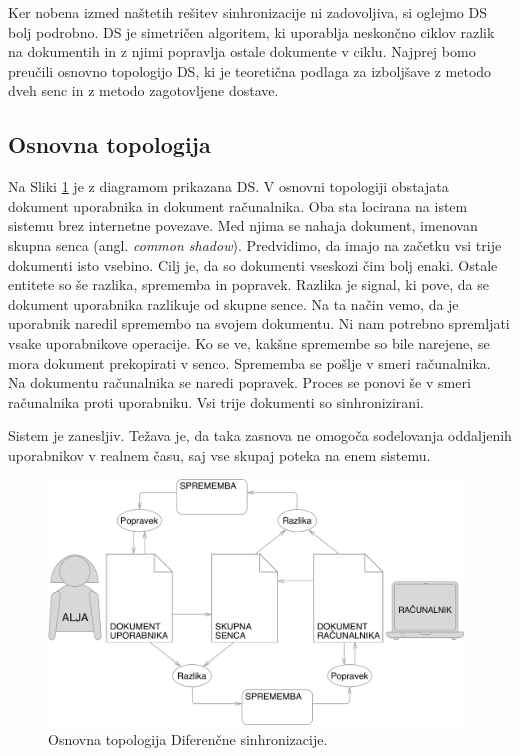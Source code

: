 \documentclass[a4paper, 12pt, twoside]{book}
\begin{document}
Ker nobena izmed naštetih rešitev sinhronizacije ni zadovoljiva, si oglejmo DS bolj podrobno. DS je simetričen algoritem, ki uporablja neskončno ciklov razlik na dokumentih in z njimi popravlja ostale dokumente v ciklu. Najprej bomo preučili osnovno topologijo DS, ki je teoretična podlaga za izboljšave z metodo dveh senc in z metodo zagotovljene dostave.

\subsection{Osnovna topologija}

Na Sliki \ref{ds1} je z diagramom prikazana DS. V osnovni topologiji obstajata dokument uporabnika in dokument računalnika. Oba sta locirana na istem sistemu brez internetne povezave. Med njima se nahaja dokument, imenovan skupna senca (angl. \textit{common shadow}). Predvidimo, da imajo na začetku vsi trije dokumenti isto vsebino. Cilj je, da so dokumenti vseskozi čim bolj enaki. Ostale entitete so še razlika, sprememba in popravek. Razlika je signal, ki pove, da se dokument uporabnika razlikuje od skupne sence. Na ta način vemo, da je uporabnik naredil spremembo na svojem dokumentu. Ni nam potrebno spremljati vsake uporabnikove operacije. Ko se ve, kakšne spremembe so bile narejene, se mora dokument prekopirati v senco. Sprememba se pošlje v smeri računalnika. Na dokumentu računalnika se naredi popravek. Proces se ponovi še v smeri računalnika proti uporabniku. Vsi trije dokumenti so sinhronizirani.

Sistem je zanesljiv. Težava je, da taka zasnova ne omogoča sodelovanja oddaljenih uporabnikov v realnem času, saj vse skupaj poteka na enem sistemu.

\begin{figure}[placement h]
\begin{center}
\includegraphics[width=11cm]{img/ds1.pdf}
\end{center}
\caption{Osnovna topologija Diferenčne sinhronizacije.}
\label{ds1}
\end{figure}
\end{document}

